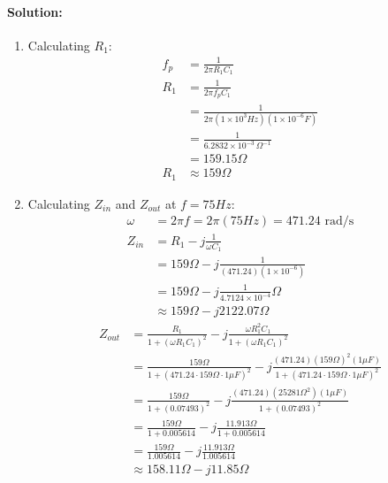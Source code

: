\paragraph{Solution:}
\begin{enumerate}
  \item Calculating \(R_1\):
    \begin{align*}
      f_p &= \frac{1}{2 \pi R_1 C_1} \\
      R_1 &= \frac{1}{2 \pi f_p C_1} \\
          &= \frac{1}{2 \pi (1 \times 10^3 Hz)(1 \times 10^{-6} F)} \\
          &= \frac{1}{6.2832 \times 10^{-3} \, \Omega^{-1}} \\
          &= 159.15 \Omega \\
      R_1 &\approx 159 \Omega
    \end{align*}
  \item Calculating \(Z_{in}\) and \(Z_{out}\) at \(f = 75Hz\):
    \begin{align*}
      \omega &= 2 \pi f = 2 \pi (75Hz) = 471.24 \text{ rad/s} \\
      Z_{in} &= R_1 - j \frac{1}{\omega C_1} \\
             &= 159 \Omega - j \frac{1}{(471.24)(1 \times 10^{-6})} \\
             &= 159 \Omega - j \frac{1}{4.7124 \times 10^{-4}} \Omega \\
             &\approx 159 \Omega - j 2122.07 \Omega
    \end{align*}
    \begin{align*}
          Z_{out} &= \frac{R_1}{1 + (\omega R_1 C_1)^2} - j \frac{\omega R_1^2 C_1}{1 + (\omega R_1 C_1)^2} \\
              &= \frac{159 \Omega}{1 + (471.24 \cdot 159 \Omega \cdot 1\mu F)^2} - j \frac{(471.24)(159 \Omega)^2 (1\mu F)}{1 + (471.24 \cdot 159 \Omega \cdot 1\mu F)^2} \\
              &= \frac{159 \Omega}{1 + (0.07493)^2} - j \frac{(471.24)(25281 \Omega^2)(1\mu F)}{1 + (0.07493)^2} \\
              &= \frac{159 \Omega}{1 + 0.005614} - j \frac{11.913 \Omega}{1 + 0.005614} \\
              &= \frac{159 \Omega}{1.005614} - j \frac{11.913 \Omega}{1.005614} \\
              &\approx 158.11 \Omega - j 11.85 \Omega
    \end{align*}
\end{enumerate}

